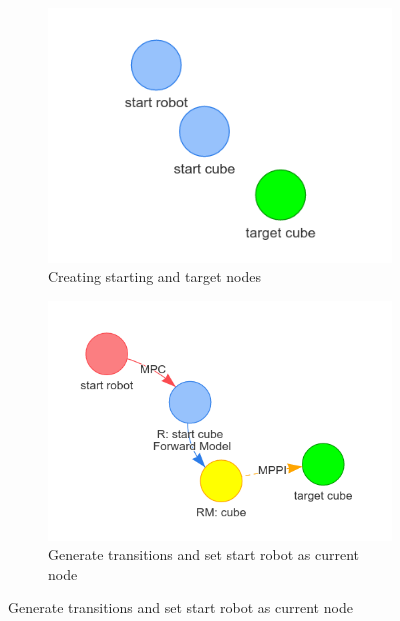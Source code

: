 \begin{figure}[H]
     \centering
     \begin{subfigure}[b]{0.49\textwidth}
         \centering
         \includegraphics[width=\textwidth]{figures/blockade/1.png}
         \caption{Creating starting and target nodes}
     \end{subfigure}
     \hfill
     \begin{subfigure}[b]{0.49\textwidth}
         \centering
         \includegraphics[width=\textwidth]{figures/blockade/2.png}
         \caption{Generate transitions and set start robot as current node}
     \end{subfigure}
     

\end{figure}
